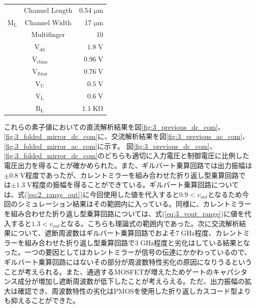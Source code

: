 \begin{table}[!b]
\begin{tabular}{c|c|r}
                    &   Channel Length   &   0.54 $\mathrm{\mu m}$   \\
                    \cline{2-3}
                    $\mathrm{M_{L}}$   &   Channel Width   &   17 $\mathrm{\mu m}$   \\
                    \cline{2-3}
                        &   Multifinger   & 10    \\
                    \hline
                    \multicolumn{2}{c|}{$\mathrm{V_{dd}}$} &   $1.8\;\mathrm{V}$   \\
                    \hline
                    \multicolumn{2}{c|}{$\mathrm{V_{rbias}}$} &   $0.96\;\mathrm{V}$   \\
                    \hline
                    \multicolumn{2}{c|}{$\mathrm{V_{lbias}}$} &   $0.76\;\mathrm{V}$   \\
                    \hline
                    \multicolumn{2}{c|}{$\mathrm{V_{U}}$} &   $0.5\;\mathrm{V}$   \\
                    \hline
                    \multicolumn{2}{c|}{$\mathrm{V_{L}}$} &   $0.6\;\mathrm{V}$   \\
                    \hline
                    \multicolumn{2}{c|}{$\mathrm{R_{L}}$} &   $1.1\;\mathrm{K \Omega}$   \\
                    \hline
            \end{tabular}
        \end{table}
        これらの素子値においての直流解析結果を図\ref{fig:3_previous_dc_com}、\ref{fig:3_folded_mirror_dc_com}に、交流解析結果を図\ref{fig:3_previous_ac_com}、\ref{fig:3_folded_mirror_ac_com}に示す。
        図\ref{fig:3_previous_dc_com}、\ref{fig:3_folded_mirror_dc_com}のどちらも適切に入力電圧と制御電圧に比例した電圧出力を得ることが確かめられた。また、ギルバート乗算回路では出力振幅は$\pm 0.8\mathrm{\;V}$程度であったが、カレントミラーを組み合わせた折り返し型乗算回路では$\pm 1.3\mathrm{\;V}$程度の振幅を得ることができている。ギルバート乗算回路については、式(\ref{eq:2_range_out})に今回使用した値を代入すると$0.9 <　v_{out}$となるため今回のシミュレーション結果はその範囲内に入っている。同様に、カレントミラーを組み合わせた折り返し型乗算回路については、式(\ref{eq:3_vout_range})に値を代入すると$1.3 < v_{out}$となる。こちらも理論式の範囲内であった。次に交流解析結果について、遮断周波数はギルバート乗算回路でおよそ$7\;\mathrm{GHz}$程度、カレントミラーを組み合わせた折り返し型乗算回路で$3\;\mathrm{GHz}$程度と劣化はしている結果となった。一つの要因としてはカレントミラーが信号の伝達にかかわっているので、ギルバート乗算回路にはないその部分が周波数特性劣化の原因になりうるということが考えられる。また、通過するMOSFETが増えたためゲートのキャパシタンス成分が増加し遮断周波数が低下したことが考えらえる。ただ、出力振幅の拡大は確認でき、周波数特性の劣化はPMOSを使用した折り返しカスコード型よりも抑えることができた。\clearpage
